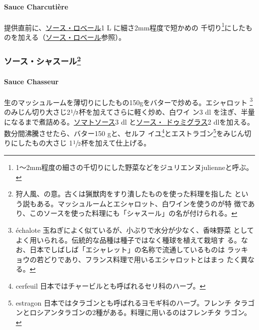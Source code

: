 \hypertarget{sauce-charcutiere}{%
\paragraph{Sauce Charcutière}\label{sauce-charcutiere}}


提供直前に、\href{}{ソース・ロベール}1 L に細さ2mm程度で短かめの
千切り\footnote{1〜2mm程度の細さの千切りにした野菜などをジュリエンヌjulienneと呼ぶ。}にしたものを加える（\href{}{ソース・ロベール}参照）。

\maeaki

\hypertarget{ux30bdux30fcux30b9ux30b7ux30e3ux30b9ux30fcux30eb10}{%
\subsubsection[ソース・シャスール]{\texorpdfstring{ソース・シャスール\footnote{狩人風、の意。古くは猟獣肉をすり潰したものを使った料理を指した
  という説もある。マッシュルームとエシャロット、白ワインを使うのが特
  徴であり、このソースを使った料理にも「シャスール」の名が付けられる。}}{ソース・シャスール}}\label{ux30bdux30fcux30b9ux30b7ux30e3ux30b9ux30fcux30eb10}}

\hypertarget{sauce-chasseur}{%
\paragraph{Sauce Chasseur}\label{sauce-chasseur}}


生のマッシュルームを薄切りにしたもの150gをバターで炒める。エシャロット
\footnote{échalote
  玉ねぎによく似ているが、小ぶりで水分が少なく、香味野菜
  としてよく用いられる。伝統的な品種は種子ではなく種球を植えて栽培す
  る。なお、日本でしばしば「エシャレット」の名称で流通しているものは
  ラッキョウの若どりであり、フランス料理で用いるエシャロットとはまっ
  たく異なる。}のみじん切り大さじ2\(\sfrac{1}{2}\)杯を加えてさらに軽く炒め、白ワイ
ン3 dl
を注ぎ、半量になるまで煮詰める。\protect\hyperlink{sauce-tomate}{ソマトソース}3
dl と\protect\hyperlink{sauce-demi-glace}{ソース・ ドゥミグラス}2
dlを加える。数分間沸騰させたら、バター150 gと、セルフ イユ\footnote{cerfeuil
  日本ではチャービルとも呼ばれるセリ科のハーブ。}とエストラゴン\footnote{estragon
  日本ではタラゴンとも呼ばれるヨモギ科のハーブ。フレンチ
  タラゴンとロシアンタラゴンの2種がある。料理に用いるのはフレンチタ
  ラゴン。}をみじん切りにしたもの大さじ
1\(\sfrac{1}{2}\)杯を加えて仕上げる。

